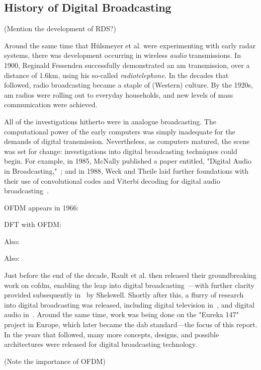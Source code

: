 \documentclass[class=report,11pt,crop=false]{standalone}
\begin{document}
\subsection{History of Digital Broadcasting}
(Mention the development of RDS?) %

Around the same time that H\"ulsmeyer et al. were experimenting with early radar systems, there was development occurring in wireless \emph{audio} transmissions. In 1900, Reginald Fessenden successfully demonstrated an \gls{am} transmission, over a distance of 1.6km, using his so-called \emph{radiotelephone}. In the decades that followed, radio broadcasting became a staple of (Western) culture. By the 1920s, \gls{am} radios were rolling out to everyday households, and new levels of mass communication were achieved.

All of the investigations hitherto were in analogue broadcasting. The computational power of the early computers was simply inadequate for the demands of digital transmission. Nevertheless, as computers matured, the scene was set for change: investigations into digital broadcasting techniques could begin. For example, in 1985, McNally published a paper entitled, "Digital Audio in Broadcasting,"~\cite{McNally1985}; and in 1988, Weck and Theile laid further foundations with their use of convolutional codes and Viterbi decoding for digital audio broadcasting~\cite{weck1988dab}.

OFDM appears in 1966: \cite{Chang1966}

DFT with OFDM: \cite{Weinstein1971}

Also: \cite{lassalle1987principles}

Also: \cite{Alard1988}

Just before the end of the decade, Rault et al. then released their groundbreaking work on \gls{cofdm}, enabling the leap into digital broadcasting~\cite{Raulta}---with further clarity provided subsequently in~\cite{Shelswell1995} by Shelswell. Shortly after this, a flurry of research into digital broadcasting was released, including digital television in~\cite{Bernard1992, stare1992}, and digital audio in~\cite{shelswell1991, Price1992, Maddocks1992}. Around the same time, work was being done on the "Eureka 147" project in Europe, which later became the \gls{dab} standard---the focus of this report. In the years that followed, many more concepts, designs, and possible architectures were released for digital broadcasting technology.

(Note the importance of OFDM)
\end{document}
